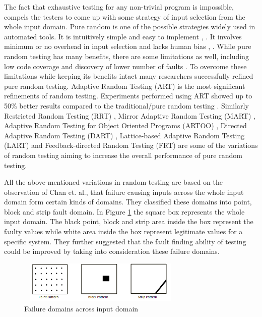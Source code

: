 \documentclass[runningheads,a4paper]{llncs}
\begin{document}
The fact that exhaustive testing for any non-trivial program is impossible, compels the testers to come up with some strategy of input selection from the whole input domain. Pure random is one of the possible strategies widely used in automated tools. It is intuitively simple and easy to implement \cite{Ciupa2008},  \cite{Forrester2000}. It involves minimum or no overhead in input selection and lacks human bias \cite{Hamlet1994},  \cite{Linger1993}. While pure random testing has many benefits, there are some limitations as well, including low code coverage \cite{Offutt1996} and discovery of lower number of faults \cite{Chen1994}. To overcome these limitations while keeping its benefits intact many researchers successfully refined pure random testing. Adaptive Random Testing (ART) is the most significant refinements of random testing. Experiments performed using ART showed up to 50\% better results compared to the traditional/pure random testing  \cite{Chen2008}.  Similarly Restricted Random Testing (RRT) \cite{Chan2002}, Mirror Adaptive Random Testing (MART)  \cite{Chen2004}, Adaptive Random Testing for Object Oriented Programs (ARTOO) \cite{Ciupa2008}, Directed Adaptive Random Testing (DART)  \cite{Godefroid2005}, Lattice-based Adaptive Random Testing (LART) \cite{Mayer2005} and Feedback-directed Random Testing (FRT) \cite{Pacheco2007} are some of the variations of random testing aiming to increase the overall performance of pure random testing.

All the above-mentioned variations in random testing are based on the observation of Chan et. al.,  \cite{Chan1996} that failure causing inputs across the whole input domain form certain kinds of domains. They classified these domains into point, block and strip fault domain. In Figure \ref{fig:patterns} the square box represents the whole input domain. The black point, block and strip area inside the box represent the faulty values while white area inside the box represent legitimate values for a specific system. They further suggested that the fault finding ability of testing could be improved by taking into consideration these failure domains.

\begin{figure}[h]
 \centering
\includegraphics[width=8cm,height=2cm]{ART_Patterns.png}
\caption{Failure domains across input domain \cite{Chan1996}}
\label{fig:patterns}
\end{figure}
\end{document}
